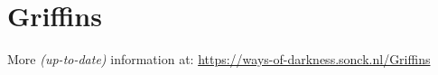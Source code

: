 \section{Griffins}
More \textit{(up-to-date)} information at: \url{https://ways-of-darkness.sonck.nl/Griffins}\newline
